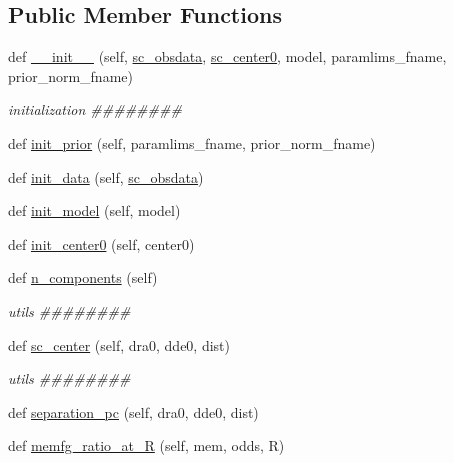 \subsection*{Public Member Functions}
\begin{DoxyCompactItemize}
\item 
def \hyperlink{classmodki17_1_1modKI17_a2514450fa8938c601d942fb15af934d4}{\+\_\+\+\_\+init\+\_\+\+\_\+} (self, \hyperlink{classmodki17_1_1modKI17_aa08fa3ee418f2bd940af163631572e8b}{sc\+\_\+obsdata}, \hyperlink{classmodki17_1_1modKI17_a6324ea4fafc077df02e9f29448b4510d}{sc\+\_\+center0}, model, paramlims\+\_\+fname, prior\+\_\+norm\+\_\+fname)
\begin{DoxyCompactList}\small\item\em initialization \#\#\#\#\#\#\#\# \end{DoxyCompactList}\item 
def \hyperlink{classmodki17_1_1modKI17_a4cf4f61966d19271b648997a58979955}{init\+\_\+prior} (self, paramlims\+\_\+fname, prior\+\_\+norm\+\_\+fname)
\item 
def \hyperlink{classmodki17_1_1modKI17_a3d999b9d3819a53a5d72c21458db8924}{init\+\_\+data} (self, \hyperlink{classmodki17_1_1modKI17_aa08fa3ee418f2bd940af163631572e8b}{sc\+\_\+obsdata})
\item 
def \hyperlink{classmodki17_1_1modKI17_aa46192663dc7cd3669186ab4bfbaae12}{init\+\_\+model} (self, model)
\item 
def \hyperlink{classmodki17_1_1modKI17_a9af006489d5ced9cce3501133db4e84c}{init\+\_\+center0} (self, center0)
\item 
def \hyperlink{classmodki17_1_1modKI17_a687b651ec8a403632770afcf8a38792d}{n\+\_\+components} (self)
\begin{DoxyCompactList}\small\item\em utils \#\#\#\#\#\#\#\# \end{DoxyCompactList}\item 
def \hyperlink{classmodki17_1_1modKI17_ad898986b5d2781fbf18c5778d393805a}{sc\+\_\+center} (self, dra0, dde0, dist)
\begin{DoxyCompactList}\small\item\em utils \#\#\#\#\#\#\#\# \end{DoxyCompactList}\item 
def \hyperlink{classmodki17_1_1modKI17_aa68e948ebfbe3aeef6d9defb249317c4}{separation\+\_\+pc} (self, dra0, dde0, dist)
\item 
def \hyperlink{classmodki17_1_1modKI17_a11ebae41e739d4bd72a9bea0de3a07b8}{memfg\+\_\+ratio\+\_\+at\+\_\+R} (self, mem, odds, R)

\end{DoxyCompactItemize}
